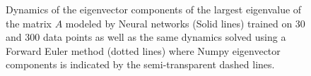 \documentclass[reprint, english, nofootinbib]{revtex4-2}
\begin{document}
\begin{figure}[h!tb]
   \center
   \caption{\label{fig:eigenvector} Dynamics of the eigenvector components of the largest eigenvalue of the matrix $A$ modeled by Neural networks (Solid lines) trained on 30 and 300 data points as well as the same dynamics solved using a Forward Euler method (dotted lines) where Numpy eigenvector components is indicated by the semi-transparent dashed lines.}
\end{figure}
\end{document}
